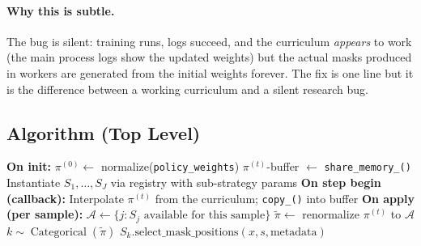 \documentclass[11pt]{article}
\DeclareMathOperator{\Cat}{Categorical}
\begin{document}
\paragraph{Why this is subtle.} The bug is silent: training runs,
logs succeed, and the curriculum \emph{appears} to work (the main
process logs show the updated weights) but the actual masks produced
in workers are generated from the initial weights forever. The fix is
one line but it is the difference between a working curriculum and a
silent research bug.

\subsection{Algorithm (Top Level)}
\begin{algorithm}[H]
\caption{Hybrid Masking}
\begin{algorithmic}[1]
\State \textbf{On init:}
\State \hspace{1em} $\pi^{(0)} \gets$ normalize(\texttt{policy\_weights})
\State \hspace{1em} $\pi^{(t)}$-buffer $\gets$ \texttt{share\_memory\_()}
\State \hspace{1em} Instantiate $S_1, \ldots, S_J$ via registry with sub-strategy params
\State \textbf{On step begin (callback):}
\State \hspace{1em} Interpolate $\pi^{(t)}$ from the curriculum; \texttt{copy\_()} into buffer
\State \textbf{On apply (per sample):}
\State \hspace{1em} $\mathcal{A} \gets \{j : S_j \text{ available for this sample}\}$
  \State \Return {}
\EndIf
\State $\tilde{\pi} \gets$ renormalize $\pi^{(t)}$ to $\mathcal{A}$
\State $k \sim \Cat(\tilde{\pi})$
\State \Return $S_k.\text{select\_mask\_positions}(x, s, \text{metadata})$
\end{algorithmic}
\end{algorithm}
\end{document}
